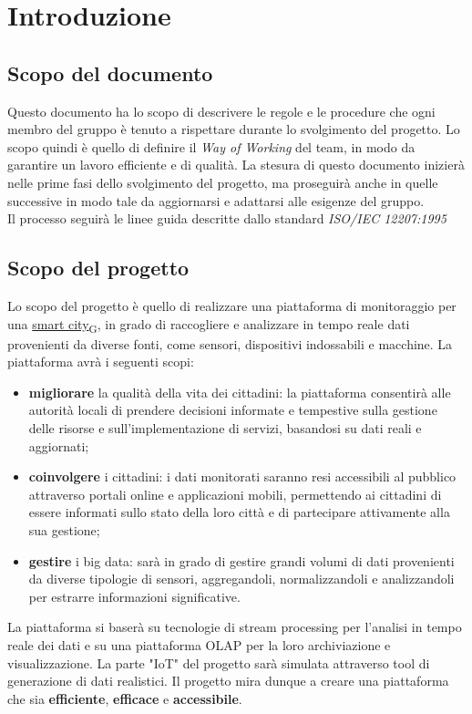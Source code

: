 \section{Introduzione}
\subsection{Scopo del documento}
Questo documento ha lo scopo di descrivere le regole e le procedure che ogni membro del gruppo è tenuto a rispettare durante lo svolgimento del progetto. Lo scopo quindi è quello di definire il \textit{Way of Working} del team, in modo da garantire un lavoro efficiente e di qualità. La stesura di questo documento inizierà nelle prime fasi dello svolgimento del progetto, ma proseguirà anche in quelle successive in modo tale da aggiornarsi e adattarsi alle esigenze del gruppo.\\ 
Il processo seguirà le linee guida descritte dallo standard \textit{ISO/IEC 12207:1995}

\subsection{Scopo del progetto}
Lo scopo del progetto è quello di realizzare una piattaforma di monitoraggio per una \href{https://7last.github.io/docs/pb/documentazione-interna/glossario\#smart-city}{smart city\textsubscript{G}}, in grado di raccogliere e analizzare in tempo reale dati provenienti da diverse fonti, come sensori, dispositivi indossabili e macchine. La piattaforma avrà i seguenti scopi:
\begin{itemize}
    \item \textbf{migliorare} la qualità della vita dei cittadini: la piattaforma consentirà alle autorità locali di prendere decisioni informate e tempestive sulla gestione delle risorse e sull'implementazione di servizi, basandosi su dati reali e aggiornati;
    \item \textbf{coinvolgere} i cittadini: i dati monitorati saranno resi accessibili al pubblico attraverso portali online e applicazioni mobili, permettendo ai cittadini di essere informati sullo stato della loro città e di partecipare attivamente alla sua gestione;
    \item \textbf{gestire} i big data: sarà in grado di gestire grandi volumi di dati provenienti da diverse tipologie di sensori, aggregandoli, normalizzandoli e analizzandoli per estrarre informazioni significative.
\end{itemize}
La piattaforma si baserà su tecnologie di stream processing per l'analisi in tempo reale dei dati e su una piattaforma OLAP per la loro archiviazione e visualizzazione. La parte "IoT" del progetto sarà simulata attraverso tool di generazione di dati realistici.
Il progetto mira dunque a creare una piattaforma che sia \textbf{efficiente}, \textbf{efficace} e \textbf{accessibile}.

